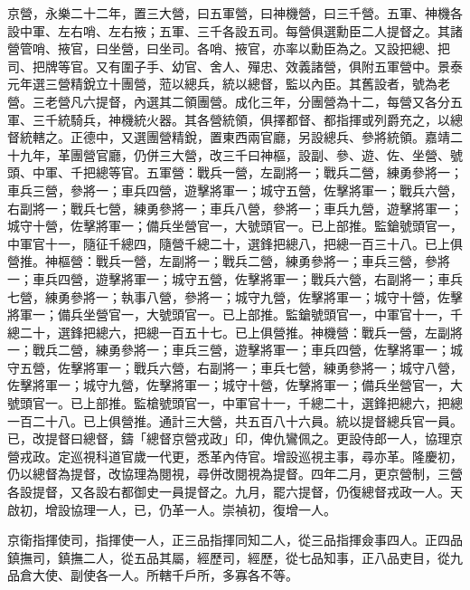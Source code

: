 京營，永樂二十二年，置三大營，曰五軍營，曰神機營，曰三千營。五軍、神機各設中軍、左右哨、左右掖；五軍、三千各設五司。每營俱選勳臣二人提督之。其諸營管哨、掖官，曰坐營，曰坐司。各哨、掖官，亦率以勳臣為之。又設把總、把司、把牌等官。又有圍子手、幼官、舍人、殫忠、效義諸營，俱附五軍營中。景泰元年選三營精銳立十團營，蒞以總兵，統以總督，監以內臣。其舊設者，號為老營。三老營凡六提督，內選其二領團營。成化三年，分團營為十二，每營又各分五軍、三千統騎兵，神機統火器。其各營統領，俱擇都督、都指揮或列爵充之，以總督統轄之。正德中，又選團營精銳，置東西兩官廳，另設總兵、參將統領。嘉靖二十九年，革團營官廳，仍併三大營，改三千曰神樞，設副、參、遊、佐、坐營、號頭、中軍、千把總等官。五軍營：戰兵一營，左副將一；戰兵二營，練勇參將一；車兵三營，參將一；車兵四營，遊擊將軍一；城守五營，佐擊將軍一；戰兵六營，右副將一；戰兵七營，練勇參將一；車兵八營，參將一；車兵九營，遊擊將軍一；城守十營，佐擊將軍一；備兵坐營官一，大號頭官一。已上部推。監鎗號頭官一，中軍官十一，隨征千總四，隨營千總二十，選鋒把總八，把總一百三十八。已上俱營推。神樞營：戰兵一營，左副將一；戰兵二營，練勇參將一；車兵三營，參將一；車兵四營，遊擊將軍一；城守五營，佐擊將軍一；戰兵六營，右副將一；車兵七營，練勇參將一；執事八營，參將一；城守九營，佐擊將軍一；城守十營，佐擊將軍一；備兵坐營官一，大號頭官一。已上部推。監鎗號頭官一，中軍官十一，千總二十，選鋒把總六，把總一百五十七。已上俱營推。神機營：戰兵一營，左副將一；戰兵二營，練勇參將一；車兵三營，遊擊將軍一；車兵四營，佐擊將軍一；城守五營，佐擊將軍一；戰兵六營，右副將一；車兵七營，練勇參將一；城守八營，佐擊將軍一；城守九營，佐擊將軍一；城守十營，佐擊將軍一；備兵坐營官一，大號頭官一。已上部推。監槍號頭官一，中軍官十一，千總二十，選鋒把總六，把總一百二十八。已上俱營推。通計三大營，共五百八十六員。統以提督總兵官一員。已，改提督曰總督，鑄「總督京營戎政」印，俾仇鸞佩之。更設侍郎一人，協理京營戎政。定巡視科道官歲一代更，悉革內侍官。增設巡視主事，尋亦革。隆慶初，仍以總督為提督，改協理為閱視，尋併改閱視為提督。四年二月，更京營制，三營各設提督，又各設右都御史一員提督之。九月，罷六提督，仍復總督戎政一人。天啟初，增設協理一人，已，仍革一人。崇禎初，復增一人。

京衛指揮使司，指揮使一人，正三品指揮同知二人，從三品指揮僉事四人。正四品鎮撫司，鎮撫二人，從五品其屬，經歷司，經歷，從七品知事，正八品吏目，從九品倉大使、副使各一人。所轄千戶所，多寡各不等。

